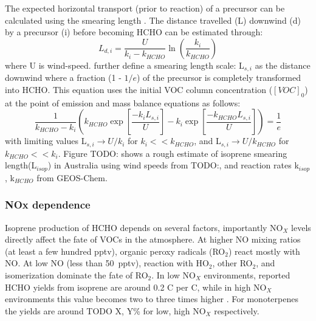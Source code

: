       The expected horizontal transport (prior to reaction) of a precursor can be calculated using the smearing length \parencite{Palmer2003}.
      The distance travelled (L) downwind (d) by a precursor (i) before becoming HCHO can be estimated through:
      \begin{equation*}
        L_{d,i} = \frac{U}{k_i - k_{HCHO}} \ln{ \left( \frac{k_i}{k_{HCHO}} \right) }
      \end{equation*}
      where U is wind-speed.
      \textcite{Palmer2003} further define a smearing length scale: L$_{s,i}$ as the distance downwind where a fraction (1 - $1/e$) of the precursor is completely transformed into HCHO.
      This equation uses the initial VOC column concentration ($[VOC]_0$) at the point of emission and mass balance equations as follows:
      \begin{equation}
      \frac{1}{k_{HCHO}-k_i} \left( k_{HCHO} \exp{ \left[ \frac{-k_i L_{s,i}}{U} \right]} -k_i \exp{ \left[ \frac{-k_{HCHO} L_{s,i}}{U} \right]} \right) = \frac{1}{e} 
      \end{equation}
      with limiting values L$_{s,i} \rightarrow U/k_i$ for $k_i << k_{HCHO}$, and L$_{s,i} \rightarrow U/k_{HCHO}$ for $k_{HCHO} << k_i$.
      Figure TODO: shows a rough estimate of isoprene smearing length(L$_{isop}$) in Australia using wind speeds from TODO:, and reaction rates k$_{isop}$, k$_{HCHO}$ from GEOS-Chem.
    
    \subsubsection{NOx dependence}
      
      Isoprene production of HCHO depends on several factors, importantly NO$_X$ levels directly affect the fate of VOCs in the atmosphere.
      At higher NO mixing ratios (at least a few hundred pptv), organic peroxy radicals (RO$_2$) react mostly with NO. 
      At low NO (less than 50~pptv), reaction with HO$_2$, other RO$_2$, and isomerization dominate the fate of RO$_2$.
      In low NO$_X$ environments, reported HCHO yields from isoprene are around 0.2 C per C, while in high NO$_X$ environments this value becomes two to three times higher \parencite{Palmer2003, Wolfe2016}.
      For monoterpenes the yields are around TODO X, Y\% for low, high NO$_X$ respectively.
      
